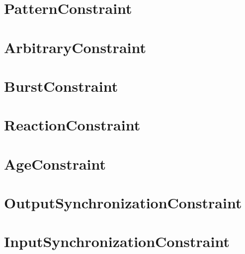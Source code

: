 \section{PatternConstraint}
\section{ArbitraryConstraint}
\section{BurstConstraint}
\section{ReactionConstraint}
\section{AgeConstraint}
\section{OutputSynchronizationConstraint}
\section{InputSynchronizationConstraint}
	
	
